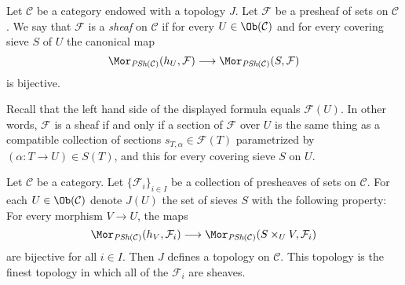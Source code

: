 \begin{definition}
\label{definition-sheaf-sets-topology}
Let $\mathcal{C}$ be a category endowed with a
topology $J$. Let $\mathcal{F}$ be a presheaf of sets
on $\mathcal{C}$.
We say that $\mathcal{F}$ is a
{\it sheaf} on $\mathcal{C}$
if for every $U \in \Ob(\mathcal{C})$ and for
every covering sieve $S$ of $U$ the canonical map
$$
\Mor_{\textit{PSh}(\mathcal{C})}(h_U, \mathcal{F})
\longrightarrow
\Mor_{\textit{PSh}(\mathcal{C})}(S, \mathcal{F})
$$
is bijective.
\end{definition}

\noindent
Recall that the left hand side of the displayed
formula equals $\mathcal{F}(U)$. In other words, $\mathcal{F}$
is a sheaf if and only if a section of $\mathcal{F}$
over $U$ is the same thing as a compatible collection of sections
$s_{T, \alpha} \in \mathcal{F}(T)$ parametrized by
$(\alpha : T \to U) \in S(T)$, and this for every covering sieve $S$
on $U$.

\begin{lemma}
\label{lemma-topology-presheaves-sheaves}
Let $\mathcal{C}$ be a category. Let $\{ \mathcal{F}_i \}_{i\in I}$ be a
collection of presheaves of sets on $\mathcal{C}$. For each
$U \in \Ob(\mathcal{C})$ denote
$J(U)$ the set of sieves $S$ with the following property:
For every morphism $V \to U$, the maps
$$
\Mor_{\textit{PSh}(\mathcal{C})}(h_V, \mathcal{F}_i)
\longrightarrow
\Mor_{\textit{PSh}(\mathcal{C})}(S \times_U V, \mathcal{F}_i)
$$
are bijective for all $i \in I$. Then $J$ defines a
topology on $\mathcal{C}$. This topology is the finest
topology in which all of the $\mathcal{F}_i$ are sheaves.
\end{lemma}

